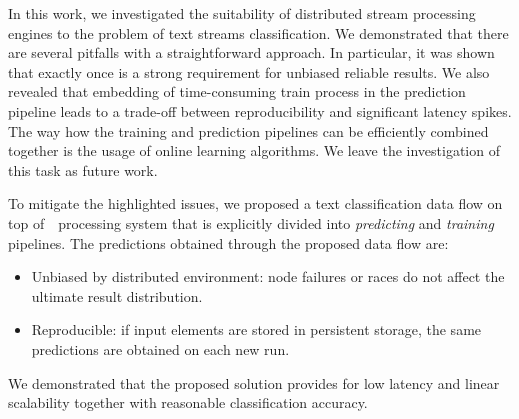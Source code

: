 \label {fs-short-conclusion}

In this work, we investigated the suitability of distributed stream processing engines to the problem of text streams classification. We demonstrated that there are several pitfalls with a straightforward approach. In particular, it was shown that exactly once is a strong requirement for unbiased reliable results. We also revealed that embedding of time-consuming train process in the prediction pipeline leads to a trade-off between reproducibility and significant latency spikes. The way how the training and prediction pipelines can be efficiently combined together is the usage of online learning algorithms. We leave the investigation of this task as future work.

To mitigate the highlighted issues, we proposed a text classification data flow on top of~\FlameStream\ processing system that is explicitly divided into {\em predicting} and {\em training} pipelines. The predictions obtained through the proposed data flow are:

\begin{itemize}
    \item Unbiased by distributed environment: node failures or races do not affect the ultimate result distribution.
    \item Reproducible: if input elements are stored in persistent storage, the same predictions are obtained on each new run.
\end{itemize}

We demonstrated that the proposed solution provides for low latency and linear scalability together with reasonable classification accuracy.